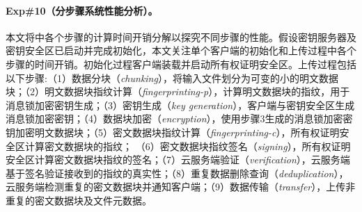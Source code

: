 \paragraph*{Exp\#10（分步骤系统性能分析）。}本文将\sysnameS 中各个步骤的计算时间开销分解以探究不同步骤的性能。假设密钥服务器及密钥安全区已启动并完成初始化，本文关注单个客户端的初始化和上传过程中各个步骤的时间开销。初始化过程客户端装载并启动所有权证明安全区。上传过程包括以下步骤:（1）数据分块（\textit{chunking}），将输入文件划分为可变的小的明文数据块；（2）明文数据块指纹计算（\textit{fingerprinting-p}），计算明文数据块的指纹，用于消息锁加密密钥生成；（3）密钥生成（\textit{key generation}），客户端与密钥安全区生成消息锁加密密钥；（4）数据块加密（\textit{encryption}），使用步骤3生成的消息锁加密密钥加密明文数据块；（5）密文数据块指纹计算（\textit{fingerprinting-c}），所有权证明安全区计算密文数据块的指纹； （6）密文数据块指纹签名（\textit{signing}），所有权证明安全区计算密文数据块指纹的签名；（7）云服务端验证（\textit{verification}），云服务端基于签名验证接收到的指纹的真实性；（8）重复数据删除查询（\textit{deduplication}），云服务端检测重复的密文数据块并通知客户端；（9）数据传输（\textit{transfer}），上传非重复的密文数据块及文件元数据。

